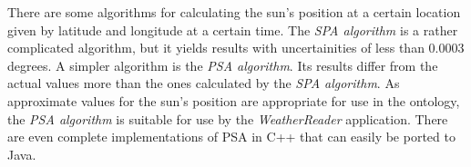 There are some algorithms for calculating the sun's position at a certain location given by latitude and longitude at a certain time. The \emph{SPA algorithm} is a rather complicated algorithm, but it yields results with uncertainities of less than 0.0003 degrees. A simpler algorithm is the \emph{PSA algorithm}. Its results differ from the actual values more than the ones calculated by the \emph{SPA algorithm}. As approximate values for the sun's position are appropriate for use in the \thinkhomeweather ontology, the \emph{PSA algorithm} is suitable for use by the \emph{WeatherReader} application. There are even complete implementations of PSA in C++ that can easily be ported to Java.
